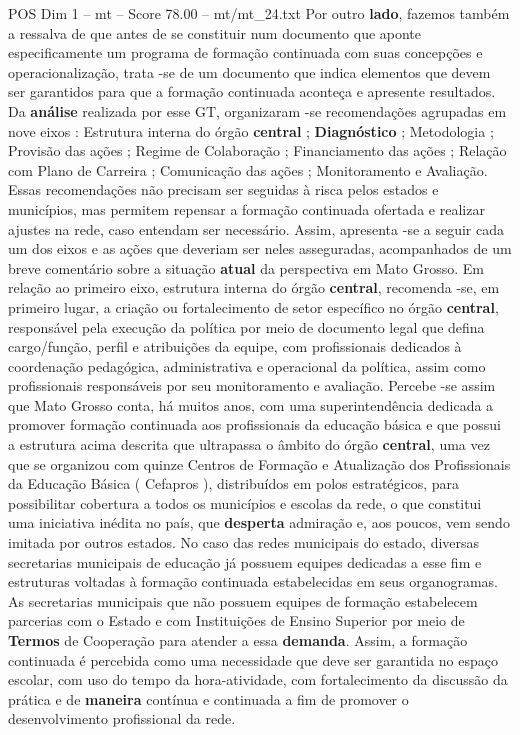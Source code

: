 \begin{textsample}{POS Dim 1 – mt – Score 78.00 – mt/mt\_24.txt}
Por outro \textbf{lado}, fazemos também a ressalva de que antes de se constituir num documento que aponte especificamente um programa de formação continuada com suas concepções e operacionalização, trata -se de um documento que indica elementos que devem ser garantidos para que a formação continuada aconteça e apresente resultados.
Da \textbf{análise} realizada por esse GT, organizaram -se recomendações agrupadas em nove eixos : Estrutura interna do órgão \textbf{central} ; \textbf{Diagnóstico} ; Metodologia ; Provisão das ações ; Regime de Colaboração ; Financiamento das ações ; Relação com Plano de Carreira ; Comunicação das ações ; Monitoramento e Avaliação.
Essas recomendações não precisam ser seguidas à risca pelos estados e municípios, mas permitem repensar a formação continuada ofertada e realizar ajustes na rede, caso entendam ser necessário.
Assim, apresenta -se a seguir cada um dos eixos e as ações que deveriam ser neles asseguradas, acompanhados de um breve comentário sobre a situação \textbf{atual} da perspectiva em Mato Grosso.
Em relação ao primeiro eixo, estrutura interna do órgão \textbf{central}, recomenda -se, em primeiro lugar, a criação ou fortalecimento de setor específico no órgão \textbf{central}, responsável pela execução da política por meio de documento legal que defina cargo/função, perfil e atribuições da equipe, com profissionais dedicados à coordenação pedagógica, administrativa e operacional da política, assim como profissionais responsáveis por seu monitoramento e avaliação.
Percebe -se assim que Mato Grosso conta, há muitos anos, com uma superintendência dedicada a promover formação continuada aos profissionais da educação básica e que possui a estrutura acima descrita que ultrapassa o âmbito do órgão \textbf{central}, uma vez que se organizou com quinze Centros de Formação e Atualização dos Profissionais da Educação Básica ( Cefapros ), distribuídos em polos estratégicos, para possibilitar cobertura a todos os municípios e escolas da rede, o que constitui uma iniciativa inédita no país, que \textbf{desperta} admiração e, aos poucos, vem sendo imitada por outros estados.
No caso das redes municipais do estado, diversas secretarias municipais de educação já possuem equipes dedicadas a esse fim e estruturas voltadas à formação continuada estabelecidas em seus organogramas.
As secretarias municipais que não possuem equipes de formação estabelecem parcerias com o Estado e com Instituições de Ensino Superior por meio de \textbf{Termos} de Cooperação para atender a essa \textbf{demanda}.
Assim, a formação continuada é percebida como uma necessidade que deve ser garantida no espaço escolar, com uso do tempo da hora-atividade, com fortalecimento da discussão da prática e de \textbf{maneira} contínua e continuada a fim de promover o desenvolvimento profissional da rede.

\end{textsample}
